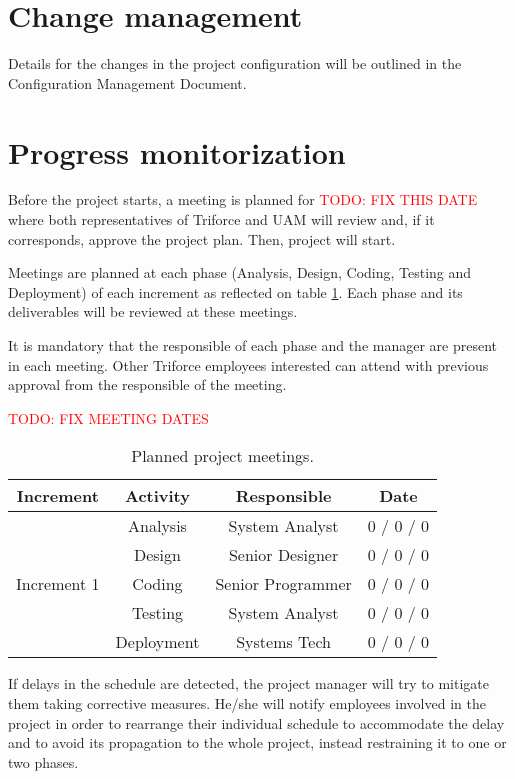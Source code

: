 \section{Change management}

Details for the changes in the project configuration will be outlined in the Configuration Management Document.

\section{Progress monitorization}

Before the project starts, a meeting is planned for \textcolor{red}{TODO: FIX THIS DATE} where both representatives of Triforce and UAM will review and, if it corresponds, approve the project plan. Then, project will start.

Meetings are planned at each phase (Analysis, Design, Coding, Testing and Deployment) of each increment as reflected on table \ref{tblPlannedMeetings}. Each phase and its deliverables will be reviewed at these meetings.

It is mandatory that the responsible of each phase and the manager are present in each meeting. Other Triforce employees interested can attend with previous approval from the responsible of the meeting.

\textcolor{red}{TODO: FIX MEETING DATES}

\begin{table}[hbtp]
\centering
\begin{tabular}{|c|c|c|c|}
\hline
\textbf{Increment} & \textbf{Activity} & \textbf{Responsible} & \textbf{Date} \\ \hline
\multirow{5}{*}{Increment 1} & Analysis & System Analyst & 0 / 0 / 0 \\ \cline{2-4}
 & Design & Senior Designer & 0 / 0 / 0 \\ \cline{2-4}
 & Coding & Senior Programmer & 0 / 0 / 0 \\ \cline{2-4}
 & Testing & System Analyst & 0 / 0 / 0 \\ \cline{2-4}
 & Deployment & Systems Tech & 0 / 0 / 0 \\ \hline
\end{tabular}
\caption{Planned project meetings.}
\label{tblPlannedMeetings}
\end{table}

If delays in the schedule are detected, the project manager will try to mitigate them taking corrective measures. He/she will notify employees involved in the project in order to rearrange their individual schedule to accommodate the delay and to avoid its propagation to the whole project, instead restraining it to one or two phases.

